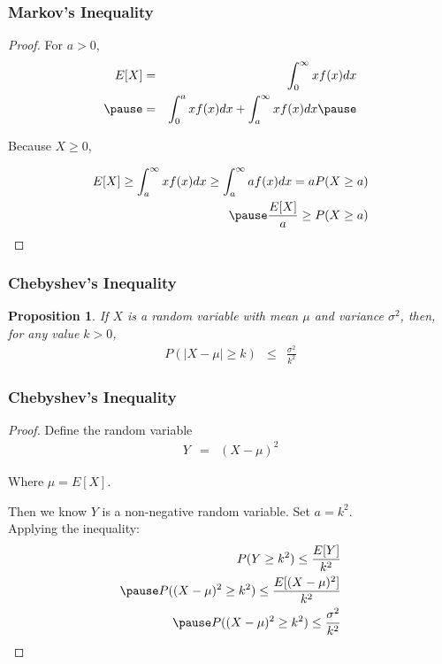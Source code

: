\documentclass{beamer}
\newtheorem{prop}{Proposition}
\numberwithin{equation}{section}
\begin{document}
\begin{frame}
\frametitle{Markov's Inequality} 


\begin{proof}
For $a>0$,  \pause 
\begin{eqnarray}
E[X] & = & \int_{0}^{\infty} x f(x) dx \nonumber \\ \pause
& = & \int_{0}^{a} x f(x) dx + \int_{a}^{\infty} x f(x) dx \nonumber  \pause 
\end{eqnarray}

Because $X\geq 0$,  \pause 

\begin{eqnarray}
E[X] \geq \int_{a}^{\infty} x f(x) dx  \geq \int_{a}^{\infty} a f(x)dx = a P(X \geq a )\nonumber \\ \pause 
\frac{E[X]}{a} \geq P(X \geq a )\nonumber 
\end{eqnarray}


\end{proof}



\end{frame}

\begin{frame}
\frametitle{Chebyshev's Inequality} 

\begin{prop} 
If $X$ is a random variable with mean $\mu$ and variance $\sigma^2$, then, for any value $k>0$, 
\begin{eqnarray}
P(|X - \mu| \geq k) & \leq & \frac{\sigma^2}{k^2} \nonumber 
\end{eqnarray}

\end{prop}


\end{frame}

\begin{frame}
\frametitle{Chebyshev's Inequality} 


\begin{proof}
Define the random variable 
\begin{eqnarray}
 Y & = & (X - \mu)^2 \nonumber 
\end{eqnarray}

Where $\mu = E[X]$. 

\pause 

Then we know $Y$ is a non-negative random variable.  Set $a = k^2$.  \\ \pause 
Applying the inequality: \pause 
\begin{eqnarray}
P(Y \geq k^2) \leq \frac{E[Y]}{k^2} \nonumber \\ \pause 
P( (X- \mu)^2 \geq k^2) \leq \frac{E[(X - \mu)^2]}{k^2} \nonumber \\ \pause 
P( (X- \mu)^2 \geq k^2) \leq \frac{\sigma^2}{k^2}\nonumber 
\end{eqnarray}

\end{proof}

\end{frame}
\end{document}

